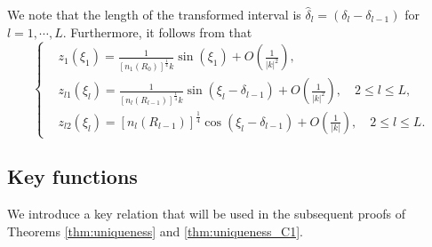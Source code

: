 \documentclass[11pt,reqno]{amsart}
\theoremstyle{definition}
\theoremstyle{remark}
\numberwithin{equation}{section}
\begin{document}
We note that the length of the transformed interval is $\hat{\delta}_l =(\delta_l - \delta_{l-1})$ for $l = 1, \cdots, L$. Furthermore, it follows from \cite{PT87} that
\begin{equation}\label{eq:z1z2 dom}	
	\left\{
	\begin{aligned}
		&z_1(\xi_1)= \frac{1}{[n_{1}(R_{0})]^{\frac{1}{4}}k}\sin{(\xi_1)}+O\left(\frac{1}{|k|^2}\right),\\
		&z_{l1}(\xi_l)= \frac{1}{[n_{l}(R_{l-1})]^{\frac{1}{4}}k}\sin{(\xi_{l}-\delta_{l-1})}+O\left(\frac{1}{|k|^2}\right), \quad 2 \leq l \leq L, \\
		&z_{l2}(\xi_l)= [n_{l}(R_{l-1})]^{\frac{1}{4}}\cos{(\xi_{l}-\delta_{l-1})}+O\left(\frac{1}{|k|}\right), \quad 2 \leq l \leq L.
	\end{aligned}
	\right.
\end{equation}



\subsection{Key functions}\label{sec:key functions}

We introduce a key relation that will be used in the subsequent proofs of Theorems \ref{thm:uniqueness} and \ref{thm:uniqueness_C1}.
\end{document}
